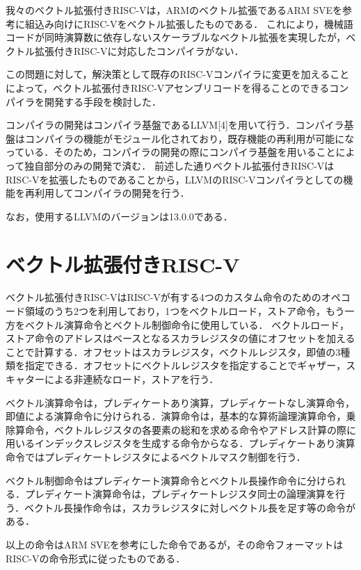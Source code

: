 \documentclass[a4paper,9pt, twocolumn]{jarticle}
\begin{document}
我々のベクトル拡張付きRISC-Vは，ARMのベクトル拡張であるARM SVE\cite{bib:arm_sve}を参考に組込み向けにRISC-V\cite{bib:risc-v}をベクトル拡張したものである．
これにより，機械語コードが同時演算数に依存しないスケーラブルなベクトル拡張を実現したが，ベクトル拡張付きRISC-Vに対応したコンパイラがない．

この問題に対して，解決策として既存のRISC-Vコンパイラに変更を加えることによって，ベクトル拡張付きRISC-Vアセンブリコードを得ることのできるコンパイラを開発する手段を検討した．

コンパイラの開発はコンパイラ基盤であるLLVM[4]を用いて行う．コンパイラ基盤はコンパイラの機能がモジュール化されており，既存機能の再利用が可能になっている．そのため，コンパイラの開発の際にコンパイラ基盤を用いることによって独自部分のみの開発で済む．
前述した通りベクトル拡張付きRISC-VはRISC-Vを拡張したものであることから，LLVMのRISC-Vコンパイラとしての機能を再利用してコンパイラの開発を行う．

なお，使用するLLVMのバージョンは13.0.0である．

\section{ベクトル拡張付きRISC-V}

ベクトル拡張付きRISC-VはRISC-Vが有する4つのカスタム命令のためのオペコード領域のうち2つを利用しており，1つをベクトルロード，ストア命令，もう一方をベクトル演算命令とベクトル制御命令に使用している．
ベクトルロード，ストア命令のアドレスはベースとなるスカラレジスタの値にオフセットを加えることで計算する．オフセットはスカラレジスタ，ベクトルレジスタ，即値の3種類を指定できる．オフセットにベクトルレジスタを指定することでギャザー，スキャターによる非連続なロード，ストアを行う．

ベクトル演算命令は，プレディケートあり演算，プレディケートなし演算命令，即値による演算命令に分けられる．演算命令は，基本的な算術論理演算命令，乗除算命令，ベクトルレジスタの各要素の総和を求める命令やアドレス計算の際に用いるインデックスレジスタを生成する命令からなる．プレディケートあり演算命令ではプレディケートレジスタによるベクトルマスク制御を行う．

ベクトル制御命令はプレディケート演算命令とベクトル長操作命令に分けられる．プレディケート演算命令は，プレディケートレジスタ同士の論理演算を行う．ベクトル長操作命令は，スカラレジスタに対しベクトル長を足す等の命令がある．

以上の命令はARM SVEを参考にした命令であるが，その命令フォーマットはRISC-Vの命令形式に従ったものである．
\end{document}
